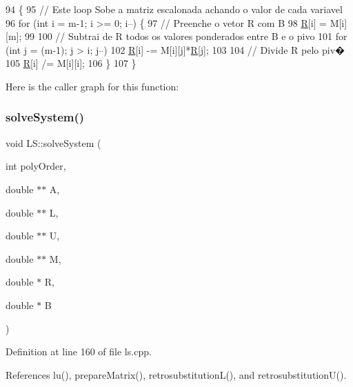 \begin{DoxyCode}
94                                                          \{
95     \textcolor{comment}{// Este loop Sobe a matriz escalonada achando o valor de cada variavel}
96     \textcolor{keywordflow}{for} (\textcolor{keywordtype}{int} i = m-1; i >= 0; i--) \{
97         \textcolor{comment}{// Preenche o vetor R com B}
98         \hyperlink{class_l_s_ade8c978a7d99f10950790c0dfec9f556}{R}[i] = M[i][m];
99 
100         \textcolor{comment}{// Subtrai de R todos os valores ponderados entre B e o pivo}
101         \textcolor{keywordflow}{for} (\textcolor{keywordtype}{int} j = (m-1); j > i; j--)
102             \hyperlink{class_l_s_ade8c978a7d99f10950790c0dfec9f556}{R}[i] -= M[i][j]*\hyperlink{class_l_s_ade8c978a7d99f10950790c0dfec9f556}{R}[j];
103 
104         \textcolor{comment}{// Divide R pelo piv�}
105         \hyperlink{class_l_s_ade8c978a7d99f10950790c0dfec9f556}{R}[i] /= M[i][i];
106     \}
107 \}
\end{DoxyCode}
Here is the caller graph for this function\+:
\mbox{\label{class_l_s_afa8644e9204234a188c3ea0269b4b039}} 
\subsubsection{\texorpdfstring{solve\+System()}{solveSystem()}}
{\footnotesize\ttfamily void L\+S\+::solve\+System (\begin{DoxyParamCaption}\item[{int}]{poly\+Order,  }\item[{double $\ast$$\ast$}]{A,  }\item[{double $\ast$$\ast$}]{L,  }\item[{double $\ast$$\ast$}]{U,  }\item[{double $\ast$$\ast$}]{M,  }\item[{double $\ast$}]{R,  }\item[{double $\ast$}]{B }\end{DoxyParamCaption})\hspace{0.3cm}{\ttfamily [private]}}



Definition at line 160 of file ls.\+cpp.



References lu(), prepare\+Matrix(), retrosubstitution\+L(), and retrosubstitution\+U().



